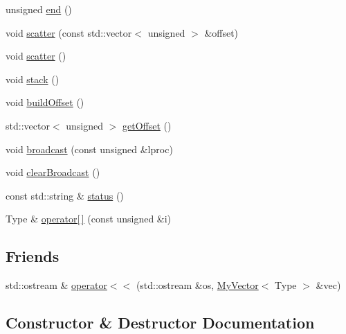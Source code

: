\begin{DoxyCompactItemize}
unsigned \mbox{\hyperlink{classfemus_1_1_my_vector_a35731f7bde0f48902b1bfbeff9d87016}{end}} ()
\item 
void \mbox{\hyperlink{classfemus_1_1_my_vector_a16baa1a2685edbd7f053f36271d4c58c}{scatter}} (const std\+::vector$<$ unsigned $>$ \&offset)
\item 
void \mbox{\hyperlink{classfemus_1_1_my_vector_a5d074ea564b1c3b960d419243b0ad1cd}{scatter}} ()
\item 
void \mbox{\hyperlink{classfemus_1_1_my_vector_a59b340154f7d4e8a5ab2b9385bdbab25}{stack}} ()
\item 
void \mbox{\hyperlink{classfemus_1_1_my_vector_a07f061a157ea4a23c4aa936db82c34ec}{build\+Offset}} ()
\item 
std\+::vector$<$ unsigned $>$ \mbox{\hyperlink{classfemus_1_1_my_vector_af5f6f37dbe0eb396f3c67d7addd66028}{get\+Offset}} ()
\item 
void \mbox{\hyperlink{classfemus_1_1_my_vector_a9e2317981b8070d85accb4d6c042f036}{broadcast}} (const unsigned \&lproc)
\item 
void \mbox{\hyperlink{classfemus_1_1_my_vector_ae674c21dc732db64806c26110367d926}{clear\+Broadcast}} ()
\item 
const std\+::string \& \mbox{\hyperlink{classfemus_1_1_my_vector_a84b07a82306c5be7bbedb104eae78c35}{status}} ()
\item 
Type \& \mbox{\hyperlink{classfemus_1_1_my_vector_ad8ce5cd1392eaf671181321962d23790}{operator\mbox{[}$\,$\mbox{]}}} (const unsigned \&i)
\end{DoxyCompactItemize}
\subsection*{Friends}
\begin{DoxyCompactItemize}
\item 
std\+::ostream \& \mbox{\hyperlink{classfemus_1_1_my_vector_af9c47e2b5e5c74df5f660672e9b9a923}{operator$<$$<$}} (std\+::ostream \&os, \mbox{\hyperlink{classfemus_1_1_my_vector}{My\+Vector}}$<$ Type $>$ \&vec)
\end{DoxyCompactItemize}


\subsection{Constructor \& Destructor Documentation}
\mbox{\label{classfemus_1_1_my_vector_a891b2c251619b6a9995a53cedf2e0c40}} 
